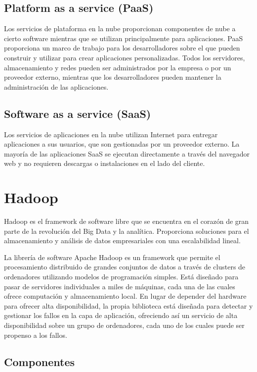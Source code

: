 \subsection{Platform as a service (PaaS)}

Los servicios de plataforma en la nube proporcionan componentes de nube a cierto software mientras que se utilizan principalmente para aplicaciones. PaaS proporciona un marco de trabajo para los desarrolladores sobre el que pueden construir y utilizar para crear aplicaciones personalizadas. Todos los servidores, almacenamiento y redes pueden ser administrados por la empresa o por un proveedor externo, mientras que los desarrolladores pueden mantener la administración de las aplicaciones. 

\subsection{Software as a service (SaaS)}

Los servicios de aplicaciones en la nube utilizan Internet para entregar aplicaciones a sus usuarios, que son gestionadas por un proveedor externo. La mayoría de las aplicaciones SaaS se ejecutan directamente a través del navegador web y no requieren descargas o instalaciones en el lado del cliente.


\section{Hadoop}

Hadoop\cite{hadoop} es el framework de software libre que se encuentra en el corazón de gran parte de la revolución del Big Data y la analítica. Proporciona soluciones para el almacenamiento y análisis de datos empresariales con una escalabilidad lineal. 

La librería de software Apache Hadoop es un framework que permite el procesamiento distribuido de grandes conjuntos de datos a través de clusters de ordenadores utilizando modelos de programación simples. Está diseñado para pasar de servidores individuales a miles de máquinas, cada una de las cuales ofrece computación y almacenamiento local. En lugar de depender del hardware para ofrecer alta disponibilidad, la propia biblioteca está diseñada para detectar y gestionar los fallos en la capa de aplicación, ofreciendo así un servicio de alta disponibilidad sobre un grupo de ordenadores, cada uno de los cuales puede ser propenso a los fallos.

\subsection{Componentes}

